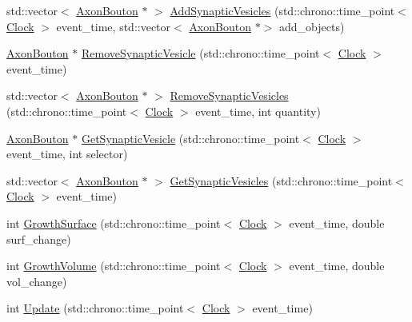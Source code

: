 \begin{DoxyCompactItemize}
\item 
std\+::vector$<$ \mbox{\hyperlink{classAxonBouton}{Axon\+Bouton}} $\ast$ $>$ \mbox{\hyperlink{classAxonBouton_a0e264da88f6ca5d77aa42f415cb4f3aa}{Add\+Synaptic\+Vesicles}} (std\+::chrono\+::time\+\_\+point$<$ \mbox{\hyperlink{universe_8h_a0ef8d951d1ca5ab3cfaf7ab4c7a6fd80}{Clock}} $>$ event\+\_\+time, std\+::vector$<$ \mbox{\hyperlink{classAxonBouton}{Axon\+Bouton}} $\ast$$>$ add\+\_\+objects)
\item 
\mbox{\hyperlink{classAxonBouton}{Axon\+Bouton}} $\ast$ \mbox{\hyperlink{classAxonBouton_a1f0b13fa7ec408c9e0cfb22cea9bbe8c}{Remove\+Synaptic\+Vesicle}} (std\+::chrono\+::time\+\_\+point$<$ \mbox{\hyperlink{universe_8h_a0ef8d951d1ca5ab3cfaf7ab4c7a6fd80}{Clock}} $>$ event\+\_\+time)
\item 
std\+::vector$<$ \mbox{\hyperlink{classAxonBouton}{Axon\+Bouton}} $\ast$ $>$ \mbox{\hyperlink{classAxonBouton_ae4119170ef72beaed3c8a0eb1d80ef14}{Remove\+Synaptic\+Vesicles}} (std\+::chrono\+::time\+\_\+point$<$ \mbox{\hyperlink{universe_8h_a0ef8d951d1ca5ab3cfaf7ab4c7a6fd80}{Clock}} $>$ event\+\_\+time, int quantity)
\item 
\mbox{\hyperlink{classAxonBouton}{Axon\+Bouton}} $\ast$ \mbox{\hyperlink{classAxonBouton_a847ab3d3d214ddc85bdfd463c6d95d54}{Get\+Synaptic\+Vesicle}} (std\+::chrono\+::time\+\_\+point$<$ \mbox{\hyperlink{universe_8h_a0ef8d951d1ca5ab3cfaf7ab4c7a6fd80}{Clock}} $>$ event\+\_\+time, int selector)
\item 
std\+::vector$<$ \mbox{\hyperlink{classAxonBouton}{Axon\+Bouton}} $\ast$ $>$ \mbox{\hyperlink{classAxonBouton_af9a35ff7a6c32ac291021cccb3d40c9b}{Get\+Synaptic\+Vesicles}} (std\+::chrono\+::time\+\_\+point$<$ \mbox{\hyperlink{universe_8h_a0ef8d951d1ca5ab3cfaf7ab4c7a6fd80}{Clock}} $>$ event\+\_\+time)
\item 
int \mbox{\hyperlink{classAxonBouton_a95fc006b2436e2c7784af2cc0bc9522e}{Growth\+Surface}} (std\+::chrono\+::time\+\_\+point$<$ \mbox{\hyperlink{universe_8h_a0ef8d951d1ca5ab3cfaf7ab4c7a6fd80}{Clock}} $>$ event\+\_\+time, double surf\+\_\+change)
\item 
int \mbox{\hyperlink{classAxonBouton_a10ac4446e777376a3944c87b2bcf26b5}{Growth\+Volume}} (std\+::chrono\+::time\+\_\+point$<$ \mbox{\hyperlink{universe_8h_a0ef8d951d1ca5ab3cfaf7ab4c7a6fd80}{Clock}} $>$ event\+\_\+time, double vol\+\_\+change)
\item 
int \mbox{\hyperlink{classAxonBouton_a26f89bac681b8f0894fe1ae249733917}{Update}} (std\+::chrono\+::time\+\_\+point$<$ \mbox{\hyperlink{universe_8h_a0ef8d951d1ca5ab3cfaf7ab4c7a6fd80}{Clock}} $>$ event\+\_\+time)
\end{DoxyCompactItemize}
